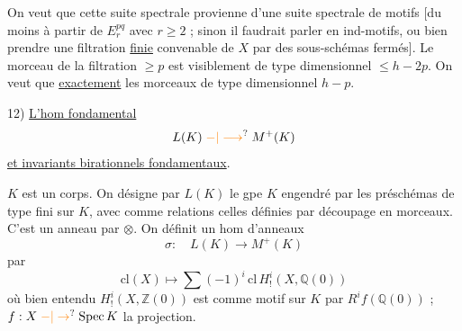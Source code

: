 On veut que  cette suite spectrale provienne d'une suite spectrale de motifs [du moins à partir de $E_r^{pq}$ avec $r\geq2$ ; sinon il faudrait parler en ind-motifs, ou bien prendre une filtration \uline{finie} convenable de $X$ par des sous-schémas fermés]. Le morceau  de la filtration $\geq p$ est visiblement de type dimensionnel $\leq h-2p$. On veut que   \uline{exactement} les morceaux de type dimensionnel $h-p$.


12) \uline{}\quad \uline{L'hom fondamental}
\[
L(K)\mathrel{\unsure{-|\longrightarrow}}M^+(K)
\]
\uline{et invariants birationnels fondamentaux}.

$K$ est un corps. On désigne par $L(K)$ le gpe $K$ engendré par les préschémas de type fini sur $K$, avec comme relations celles définies par découpage en morceaux. C'est un anneau par $\otimes$. On définit un hom d'anneaux
\[
\sigma:\quad L(K)\longrightarrow M^+(K)
\]
par
\[
\mathrm{cl}(X)\mapsto\sum(-1)^i\,\mathrm{cl}\,H^i_!(X,\mathbb Q(0))
\]
où bien entendu $H^i_!(X,\mathbb Z(0))$ est  comme motif sur $K$ par $R^if(\mathbb Q(0))$ ; $f:X\mathrel{\unsure{-|\to}}\operatorname{Spec}K$ la projection.

